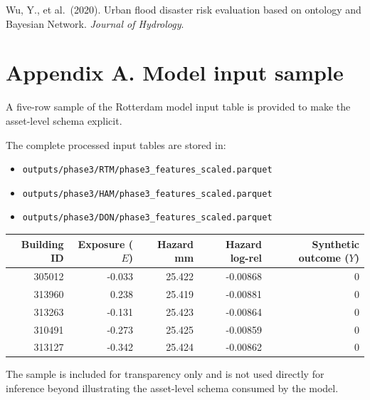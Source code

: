 \documentclass[
]{article}
\providecommand{\tightlist}{%
  \setlength{\itemsep}{0pt}\setlength{\parskip}{0pt}}
\begin{document}
Wu, Y., et al.~(2020). Urban flood disaster risk evaluation based on
ontology and Bayesian Network. \emph{Journal of Hydrology}.

\section{Appendix A. Model input
sample}\label{appendix-a.-model-input-sample}

A five-row sample of the Rotterdam model input table is provided to make
the asset-level schema explicit.

The complete processed input tables are stored in:

\begin{itemize}
\tightlist
\item
  \texttt{outputs/phase3/RTM/phase3\_features\_scaled.parquet}
\item
  \texttt{outputs/phase3/HAM/phase3\_features\_scaled.parquet}
\item
  \texttt{outputs/phase3/DON/phase3\_features\_scaled.parquet}
\end{itemize}

\begin{table}[H]
\centering
\small
\begin{tabular}{rrrrr}
\toprule
Building ID & Exposure ($E$) & Hazard mm & Hazard log-rel & Synthetic outcome ($Y$) \\
\midrule
305012 & -0.033 & 25.422 & -0.00868 & 0 \\
313960 & 0.238 & 25.419 & -0.00881 & 0 \\
313263 & -0.131 & 25.423 & -0.00864 & 0 \\
310491 & -0.273 & 25.425 & -0.00859 & 0 \\
313127 & -0.342 & 25.424 & -0.00862 & 0 \\
\bottomrule
\end{tabular}
\end{table}

The sample is included for transparency only and is not used directly
for inference beyond illustrating the asset-level schema consumed by the
model.
\end{document}
